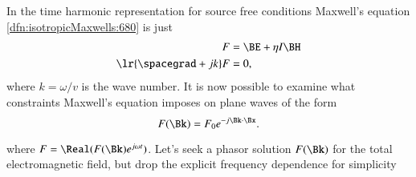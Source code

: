 %
%
In the time harmonic representation for source free conditions Maxwell's equation \cref{dfn:isotropicMaxwells:680} is just
\begin{dmath}\label{eqn:planewaves:560}
\begin{aligned}
F &= \BE + \eta I \BH \\
\lr{ \spacegrad + j k } F &= 0,
\end{aligned}
\end{dmath}
where \( k = \omega/v \) is the wave number.
It is now possible to examine what constraints Maxwell's equation imposes on plane waves of the form
\begin{dmath}\label{eqn:planewaves:600}
F(\Bk) = F_0 e^{-j \Bk \cdot \Bx}.
\end{dmath}

where \( F = \Real( F(\Bk) e^{j \omega t} ) \).
Let's seek a phasor solution \( F(\Bk) \) for the total electromagnetic field, but drop the explicit frequency dependence for simplicity



